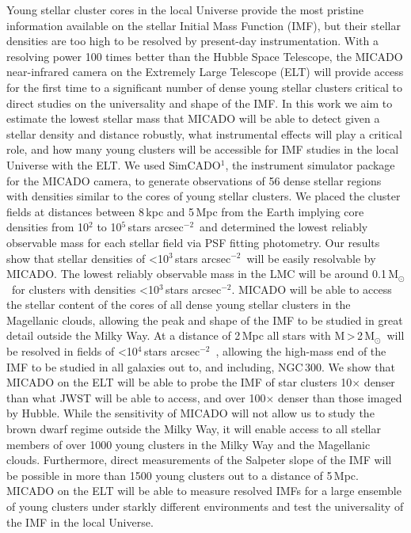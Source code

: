 \documentclass{aa}
\newcommand{\msun}{M$_\odot$~}
\newcommand{\h}[1]{$^{#1}$}
\newcommand{\spa}{stars arcsec$^{-2}$~}
\newcommand{\spae}{stars arcsec$^{-2}$}
\begin{document}
  \abstract
{Young stellar cluster cores in the local Universe provide the most pristine information available on the stellar Initial Mass Function (IMF), but their stellar densities are too high to be resolved by present-day instrumentation.
With a resolving power 100 times better than the Hubble Space Telescope, the MICADO near-infrared camera on the Extremely Large Telescope (ELT) will provide access for the first time to a significant number of dense young stellar clusters critical to direct studies on the universality and shape of the IMF.}
{In this work we aim to estimate the lowest stellar mass that MICADO will be able to detect given a stellar density and distance robustly, what instrumental effects will play a critical role, and how many young clusters will be accessible for IMF studies in the local Universe with the ELT.}
{We used SimCADO$^1$, the instrument simulator package for the MICADO camera, to generate observations of 56 dense stellar regions with densities similar to the cores of young stellar clusters.
We placed the cluster fields at distances between 8\,kpc and 5\,Mpc from the Earth implying core densities from 10\h2 to 10\h5\,\spa and determined the lowest reliably observable mass for each stellar field via PSF fitting photometry.}
{Our results show that stellar densities of \textless10\h3\,\spa will be easily resolvable by MICADO. The lowest reliably observable mass in the LMC will be around 0.1\,\msun for clusters with densities \textless10\h3\,\spae.
MICADO will be able to access the stellar content of the cores of all dense young stellar clusters in the Magellanic clouds, allowing the peak and shape of the IMF to be studied in great detail outside the Milky Way.
At a distance of 2\,Mpc all stars with M\,\textgreater\,2\,\msun will be resolved in fields of \textless10\h4\,\spa, allowing the high-mass end of the IMF to be studied in all galaxies out to, and including, NGC\,300.}
{We show that MICADO on the ELT will be able to probe the IMF of star clusters 10$\times$ denser than what JWST will be able to access, and over 100$\times$ denser than those imaged by Hubble.
While the sensitivity of MICADO will not allow us to study the brown dwarf regime outside the Milky Way, it will enable access to all stellar members of over 1000 young clusters in the Milky Way and the Magellanic clouds.
Furthermore, direct measurements of the Salpeter slope of the IMF will be possible in more than 1500 young clusters out to a distance of 5\,Mpc.
MICADO on the ELT will be able to measure resolved IMFs for a large ensemble of young clusters under starkly different environments and test the universality of the IMF in the local Universe.}
\end{document}
